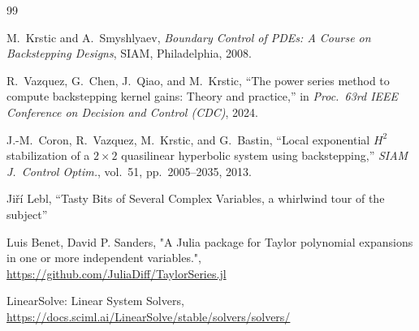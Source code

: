 \documentclass[11pt,a4paper]{article}
\begin{document}
\begin{thebibliography}{99}

M.~Krstic and A.~Smyshlyaev, \emph{Boundary Control of PDEs: A Course on Backstepping Designs}, SIAM, Philadelphia, 2008.


R.~Vazquez, G.~Chen, J.~Qiao, and M.~Krstic, ``The power series method to compute backstepping kernel gains: Theory and practice,'' in \emph{Proc.\ 63rd IEEE Conference on Decision and Control (CDC)}, 2024.

J.-M.~Coron, R.~Vazquez, M.~Krstic, and G.~Bastin, ``Local exponential $H^2$ stabilization of a $2 \times 2$ quasilinear hyperbolic system using backstepping,'' \emph{SIAM J.\ Control Optim.}, vol.~51, pp.~2005--2035, 2013.

Jiří Lebl, ``Tasty Bits of Several Complex Variables, a whirlwind tour of the subject''

Luis Benet, David P. Sanders, "A Julia package for Taylor polynomial expansions in one or more independent variables.", \url{https://github.com/JuliaDiff/TaylorSeries.jl}

LinearSolve: Linear System Solvers, \url{https://docs.sciml.ai/LinearSolve/stable/solvers/solvers/}


\end{thebibliography}
\end{document}
